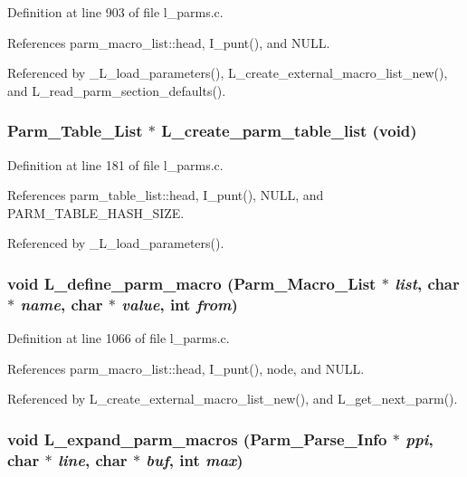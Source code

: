 Definition at line 903 of file l\_\-parms.c.

References parm\_\-macro\_\-list::head, I\_\-punt(), and NULL.

Referenced by \_\-L\_\-load\_\-parameters(), L\_\-create\_\-external\_\-macro\_\-list\_\-new(), and L\_\-read\_\-parm\_\-section\_\-defaults().
\subsubsection{\setlength{\rightskip}{0pt plus 5cm}\bf{Parm\_\-Table\_\-List} $\ast$ L\_\-create\_\-parm\_\-table\_\-list (void)}\label{l__parms_8c_aa30776a4ea3af977de79575a3d39027}




Definition at line 181 of file l\_\-parms.c.

References parm\_\-table\_\-list::head, I\_\-punt(), NULL, and PARM\_\-TABLE\_\-HASH\_\-SIZE.

Referenced by \_\-L\_\-load\_\-parameters().
\subsubsection{\setlength{\rightskip}{0pt plus 5cm}void L\_\-define\_\-parm\_\-macro (\bf{Parm\_\-Macro\_\-List} $\ast$ {\em list}, char $\ast$ {\em name}, char $\ast$ {\em value}, int {\em from})}\label{l__parms_8c_161297346e7b7187fe6b8ba6cf0ad8c9}




Definition at line 1066 of file l\_\-parms.c.

References parm\_\-macro\_\-list::head, I\_\-punt(), node, and NULL.

Referenced by L\_\-create\_\-external\_\-macro\_\-list\_\-new(), and L\_\-get\_\-next\_\-parm().
\subsubsection{\setlength{\rightskip}{0pt plus 5cm}void L\_\-expand\_\-parm\_\-macros (\bf{Parm\_\-Parse\_\-Info} $\ast$ {\em ppi}, char $\ast$ {\em line}, char $\ast$ {\em buf}, int {\em max})}\label{l__parms_8c_a8daa04b51e71adb5f4707982295e612}




